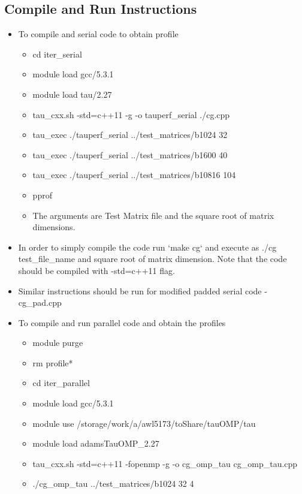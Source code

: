 \documentclass{article}
\begin{document}
\begin{spacing}{1.1}
\begin{appendices}
\begin{itemize}
\end{itemize}

\subsection{Compile and Run Instructions}
\begin{itemize}
    \item To compile and serial code to obtain profile
    \begin{itemize}
        \item cd iter\_serial
        \item module load gcc/5.3.1
        \item module load tau/2.27
        \item tau\_cxx.sh -std=c++11 -g -o tauperf\_serial ./cg.cpp
        \item tau\_exec ./tauperf\_serial  ../test\_matrices/b1024 32
        \item tau\_exec ./tauperf\_serial  ../test\_matrices/b1600 40
        \item tau\_exec ./tauperf\_serial  ../test\_matrices/b10816 104
        \item pprof
        \item The arguments are Test Matrix file and the square root of matrix dimensions.
    \end{itemize}
    \item In order to simply compile the code run `make cg` and execute as ./cg test\_file\_name and square root of matrix dimension. Note that the code should be compiled with -std=c++11 flag.
    \item Similar instructions should be run for modified padded serial code - cg\_pad.cpp
    \item To compile and run parallel code and obtain the profiles
    \begin{itemize}
        \item module purge
        \item rm profile*
        \item cd iter\_parallel
        \item module load gcc/5.3.1
        \item module use /storage/work/a/awl5173/toShare/tauOMP/tau
        \item module load adamsTauOMP\_2.27
        \item tau\_cxx.sh -std=c++11 -fopenmp -g -o cg\_omp\_tau cg\_omp\_tau.cpp
        \item ./cg\_omp\_tau ../test\_matrices/b1024 32 4

\end{itemize}
\end{itemize}
\end{appendices}
\end{spacing}
\end{document}
